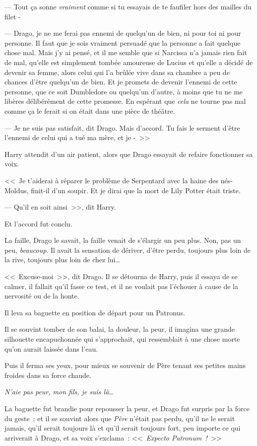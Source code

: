--- Tout ça sonne \emph{vraiment} comme si tu essayais de te faufiler hors des mailles du filet -

--- Drago, je ne me ferai pas ennemi de quelqu'un de bien, ni pour toi ni pour personne. Il faut que je sois vraiment persuadé que la personne a fait quelque chose mal. Mais j'y ai pensé, et il me semble que si Narcissa n'a jamais rien fait de mal, qu'elle est simplement tombée amoureuse de Lucius et qu'elle a décidé de devenir sa femme, alors celui qui l'a brûlée vive dans sa chambre a peu de chances d'être quelqu'un de bien. Et je promets de devenir l'ennemi de cette personne, que ce soit Dumbledore ou quelqu'un d'autre, à moins que tu ne me libères délibérément de cette promesse. En espérant que \emph{cela} ne tourne pas mal comme ça le ferait si on était dans une pièce de théâtre.

--- Je ne suis pas satisfait, dit Drago. Mais d'accord. Tu fais le serment d'être l'ennemi de celui qui a tué ma mère, et je -~>>

Harry attendit d'un air patient, alors que Drago essayait de refaire fonctionner sa voix.

<<~Je t'aiderai à réparer le problème de Serpentard avec la haine des nés-Moldus, finit-il d'un soupir. Et je dirai que la mort de Lily Potter était triste.

--- Qu'il en soit ainsi~>>, dit Harry.

Et l'accord fut conclu.

La faille, Drago le savait, la faille venait de s'élargir un peu plus. Non, pas un peu, \emph{beaucoup}. Il avait la sensation de dériver, d'être perdu, toujours plus loin de la rive, toujours plus loin de chez lui…

<<~Excuse-moi~>>, dit Drago. Il se détourna de Harry, puis il essaya de se calmer, il fallait qu'il fasse ce test, et il ne voulait pas l'échouer à cause de la nervosité ou de la honte.

Il leva sa baguette en position de départ pour un Patronus.

Il se souvint tomber de son balai, la douleur, la peur, il imagina une grande silhouette encapuchonnée qui s'approchait, qui ressemblait à une chose morte qu'on aurait laissée dans l'eau.

Puis il ferma ses yeux, pour mieux se souvenir de Père tenant ses petites mains froides dans sa force chaude.

\emph{N'aie pas peur, mon fils, je suis là…}

La baguette fut brandie pour repousser la peur, et Drago fut surpris par la force du geste~; et il se souvint alors que \emph{Père} n'était pas perdu, qu'il ne le serait jamais, qu'il serait toujours là et qu'il serait toujours fort, peu importe ce qui arriverait à Drago, et sa voix s'exclama~: <<~\emph{Expecto Patronum~!}~>>

